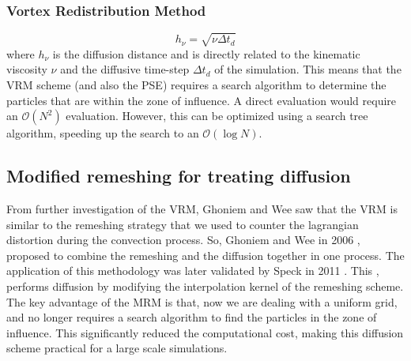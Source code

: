 \subsubsection*{Vortex Redistribution Method}
	\begin{equation}
	h_{\nu} = \sqrt{\nu\Delta t_d}
	\end{equation}
where $h_{\nu}$ is the diffusion distance and is directly related to the kinematic viscosity $\nu$ and the diffusive time-step $\Delta t_d$ of the simulation. This means that the VRM scheme (and also the PSE) requires a search algorithm to determine the particles that are within the zone of influence. A direct evaluation would require an $\mathcal{O}\left(N^2\right)$ evaluation. However, this can be optimized using a search tree algorithm, speeding up the search to an $\mathcal{O}\left(\log N\right)$.



\subsection{Modified remeshing for treating diffusion}
\label{subsec:modifiedRemeshing}
From further investigation of the VRM, Ghoniem and Wee saw that the VRM is similar to the remeshing strategy that we used to counter the lagrangian distortion during the convection process. So, Ghoniem and Wee in 2006 \cite{Wee2006a}, proposed to combine the remeshing and the diffusion together in one process. The application of this methodology was later validated by Speck in 2011 \cite{Speck2011a}. This , performs diffusion by modifying the interpolation kernel of the remeshing scheme. The key advantage of the MRM is that, now we are dealing with a uniform grid, and no longer requires a search algorithm to find the particles in the zone of influence. This significantly reduced the computational cost, making this diffusion scheme practical for a large scale simulations. 

